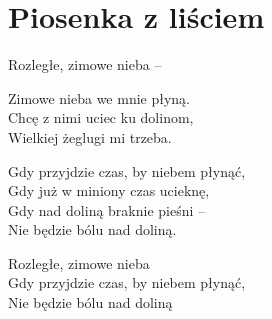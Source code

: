 \section{Piosenka z liściem}
\begin{text}
Rozległe, zimowe nieba –

Zimowe nieba we mnie płyną.\\
Chcę z nimi uciec ku dolinom,\\
Wielkiej żeglugi mi trzeba.

Gdy przyjdzie czas, by niebem płynąć,\\
Gdy już w miniony czas ucieknę,\\
Gdy nad doliną braknie pieśni –\\
Nie będzie bólu nad doliną.

Rozległe, zimowe nieba\\
Gdy przyjdzie czas, by niebem płynąć,\\
Nie będzie bólu nad doliną
\end{text}